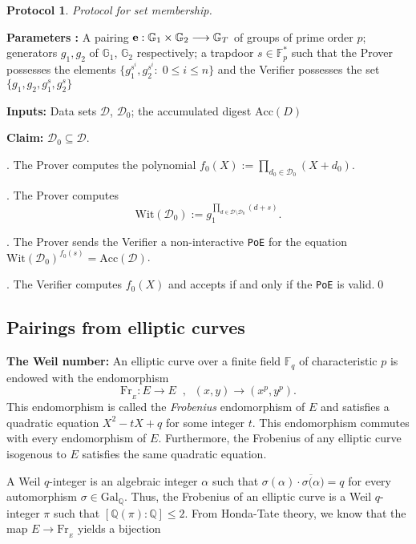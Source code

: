 \documentclass[a4paper, 11pt]{scrreprt}
\newtheorem{Prot}[Thm]{Protocol}
\numberwithin{equation}{section}
\newcommand{\bF}{\mathbb F}
\newcommand{\bq}{\mathbb Q}
\newcommand{\bFp}{\mathbb{F}_p}
\newcommand{\absq}{\mathrm{Gal}_{\bq}}
\newcommand{\lra}{\longrightarrow}
\newcommand{\mc}{\mathcal}
\newcommand{\mb}{\mathbb}
\newcommand{\mr}{\mathrm}
\newcommand{\al}{\alpha}
\newcommand{\ov}{\overline}
\newcommand{\sub}{\subseteq}
\newcommand{\vs}{\vspace{-2mm}}
\newcommand{\noin}{\noindent}
\theoremstyle{plain}
\begin{document}
\begin{mdframed} \begin{Prot} Protocol for set membership.\end{Prot} 

\noindent \textbf{Parameters :} A pairing ${\bf{e}}: \mb{G}_1\times \mb{G}_2\lra \mb{G}_T$ of groups of prime order $p$; generators $g_1, g_2$ of $\mb{G}_1$, $\mb{G}_2$ respectively; a trapdoor $s\in \bFp^*$ such that the Prover possesses the elements $\{g_1^{s^i}, g_2^{s^i}:\; 0\leq i\leq n \}$ and the Verifier possesses the set $\{g_1, g_2, g_1^s, g_2^s \}$ 

\noindent \textbf{Inputs:} Data sets $\mc{D}$, $\mc{D}_0$; the accumulated digest $\mr{Acc}(D)$

\noindent \textbf{Claim:} $\mc{D}_0\sub \mc{D}$.\vspace{0.1cm}

\normalfont \noin 1. The Prover computes the polynomial $f_0(X):= \prod\limits_{d_0\in \mc{D}_0}(X+d_0)$.

. The Prover computes $$\mr{Wit}(\mc{D}_0) := g_1^{\prod\limits_{d\in \mc{D}\setminus \mc{D}_0} (d+s)}.$$

. The Prover sends the Verifier a non-interactive \verb|PoE| for the equation $\mr{Wit}(\mc{D}_0)^{f_0(s)} = \mr{Acc}(\mc{D})$.

. The Verifier computes $f_0(X)$ and accepts if and only if the \verb|PoE| is valid.\qed \end{mdframed}

\bigskip


\subsection{\fontsize{11}{11}\selectfont Pairings from elliptic curves}



\noin \textbf{The Weil number:} An elliptic curve over a finite field $\bF _q$ of characteristic $p$ is endowed with the endomorphism \vs $$\mr{Fr}_{_E} : E\lra E\;\;,\;\;(x,y)\lra (x^p, y^p) .$$ This endomorphism is called the \textit{Frobenius} endomorphism of $E$ and satisfies a quadratic equation $X^2 - tX + q$ for some integer $t$. This endomorphism commutes with every endomorphism of $E$. Furthermore, the Frobenius of any elliptic curve isogenous to $E$ satisfies the same quadratic equation.

A Weil $q$-integer is an algebraic integer $\al$ such that $\sigma(\al)\cdot \ov{\sigma(\al}) = q$ for every automorphism $\sigma\in \absq$. Thus, the Frobenius of an elliptic curve is a Weil $q$-integer $\pi$ such that $[\bq(\pi):\bq]\leq 2$. From Honda-Tate theory, we know that the map $E\lra \mr{Fr}_{_E}$ yields a bijection \vspace{-5mm}
\end{document}
